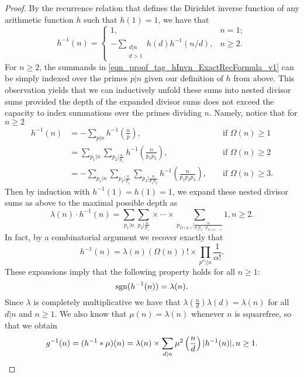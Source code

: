 \documentclass[11pt,reqno,a4letter]{article}
\numberwithin{figure}{section}
\numberwithin{table}{section}
\theoremstyle{plain}
\numberwithin{theorem}{section}
\theoremstyle{definition}
\begin{document}
\begin{proof}
By the recurrence relation that defines the Dirichlet inverse function of any 
arithmetic function $h$ such that $h(1) = 1$, we have that \cite[\S 2.7]{APOSTOLANUMT} 
\begin{equation} 
\label{eqn_proof_tag_hInvn_ExactRecFormula_v1}
h^{-1}(n) = \begin{cases} 
            1, & n = 1; \\ 
            -\sum\limits_{\substack{d|n \\ d>1}} h(d) h^{-1}(n/d), & n \geq 2. 
            \end{cases} 
\end{equation} 
For $n \geq 2$, the summands in \eqref{eqn_proof_tag_hInvn_ExactRecFormula_v1} 
can be simply indexed over the primes $p|n$ given our definition of $h$ from above. 
This observation yields that we can inductively 
unfold these sums into nested divisor sums provided the depth of the 
expanded divisor sums does not exceed the 
capacity to index summations over the primes dividing $n$. Namely, notice that for $n \geq 2$ 
\begin{align*} 
h^{-1}(n) & = -\sum_{p|n} h^{-1}\left(\frac{n}{p}\right), && \text{\ if\ } \Omega(n) \geq 1 \\ 
     & = \sum_{p_1|n} \sum_{p_2|\frac{n}{p_1}} h^{-1}\left(\frac{n}{p_1p_2}\right), && \text{\ if\ } \Omega(n) \geq 2 \\ 
     & = -\sum_{p_1|n} \sum_{p_2|\frac{n}{p_1}} \sum_{p_3|\frac{n}{p_1p_2}} h^{-1}\left(\frac{n}{p_1p_2p_3}\right), 
     && \text{\ if\ } \Omega(n) \geq 3. 
\end{align*} 
Then by induction with $h^{-1}(1) = h(1) = 1$, we expand these 
nested divisor sums as above to the maximal possible depth as 
\begin{equation} 
\label{eqn_proof_tag_hInvn_ExactNestedSumFormula_v2} 
\lambda(n) \cdot h^{-1}(n) = \sum_{p_1|n} \sum_{p_2|\frac{n}{p_1}} \times \cdots \times 
     \sum_{p_{\Omega(n)}|\frac{n}{p_1p_2 \cdots p_{\Omega(n)-1}}} 1, n \geq 2. 
\end{equation} 
In fact, by a combinatorial argument we recover exactly that 
\begin{equation} 
\label{eqn_proof_tag_hInvn_ExactNestedSumFormula_CombInterpetIdent_v3} 
h^{-1}(n) = \lambda(n) (\Omega(n))! \times \prod_{p^{\alpha} || n} \frac{1}{\alpha!}. 
\end{equation} 
These expansions imply that the following property holds for all $n \geq 1$: 
\begin{equation} 
\notag 
\operatorname{sgn}(h^{-1}(n)) = \lambda(n). 
\end{equation} 
Since $\lambda$ is completely multiplicative we have that 
$\lambda\left(\frac{n}{d}\right) \lambda(d) = \lambda(n)$ for all 
$d|n$ and $n \geq 1$. We also know that $\mu(n) = \lambda(n)$ whenever $n$ is squarefree, 
so that we obtain
\[
g^{-1}(n) = (h^{-1} \ast \mu)(n) = \lambda(n) \times \sum_{d|n} \mu^2\left(\frac{n}{d}\right) |h^{-1}(n)|, n \geq 1. 
     \qedhere 
\]
\end{proof} 
\end{document}
